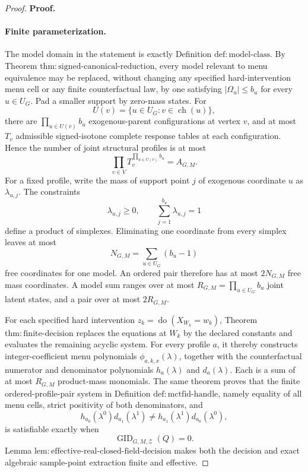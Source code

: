\documentclass{article}
\begin{document}
\begin{proof}
\textbf{Proof.}
\paragraph{Finite parameterization.}
The model domain in the statement is exactly Definition \(\mathrm{def:model\text{-}class}\).  By Theorem \(\mathrm{thm:signed\text{-}canonical\text{-}reduction}\), every model relevant to menu equivalence may be replaced, without changing any specified hard-intervention menu cell or any finite counterfactual law, by one satisfying \(|\Omega_u|\le b_u\) for every \(u\in U_G\).  Pad a smaller support by zero-mass states.  For
\[
 U(v)=\{u\in U_G:v\in\operatorname{ch}(u)\},
\]
there are \(\prod_{u\in U(v)}b_u\) exogenous-parent configurations at vertex \(v\), and at most \(T_v\) admissible signed-isotone complete response tables at each configuration.  Hence the number of joint structural profiles is at most
\[
 \prod_{v\in V}T_v^{\prod_{u\in U(v)}b_u}=A_{G,M}.
\tag{1}
\]
For a fixed profile, write the mass of support point \(j\) of exogenous coordinate \(u\) as \(\lambda_{u,j}\).  The constraints
\[
 \lambda_{u,j}\ge0,
 \qquad
 \sum_{j=1}^{b_u}\lambda_{u,j}=1
\tag{2}
\]
define a product of simplexes.  Eliminating one coordinate from every simplex leaves at most
\[
 N_{G,M}=\sum_{u\in U_G}(b_u-1)
\tag{3}
\]
free coordinates for one model.  An ordered pair therefore has at most \(2N_{G,M}\) free mass coordinates.  A model sum ranges over at most \(R_{G,M}=\prod_{u\in U_G}b_u\) joint latent states, and a pair over at most \(2R_{G,M}\).

For each specified hard intervention \(z_k=\operatorname{do}(X_{W_k}=w_k)\), Theorem \(\mathrm{thm:finite\text{-}decision}\) replaces the equations at \(W_k\) by the declared constants and evaluates the remaining acyclic system.  For every profile \(a\), it thereby constructs integer-coefficient menu polynomials \(\phi_{a,k,x}(\lambda)\), together with the counterfactual numerator and denominator polynomials \(h_a(\lambda)\) and \(d_a(\lambda)\).  Each is a sum of at most \(R_{G,M}\) product-mass monomials.  The same theorem proves that the finite ordered-profile-pair system in Definition \(\mathrm{def:mctfid\text{-}handle}\), namely equality of all menu cells, strict positivity of both denominators, and
\[
 h_{a_0}(\lambda^0)d_{a_1}(\lambda^1)
 \ne
 h_{a_1}(\lambda^1)d_{a_0}(\lambda^0),
\tag{4}
\]
is satisfiable exactly when
\[
 \operatorname{GID}_{G,M,\mathcal Z}(Q)=0.
\tag{5}
\]
Lemma \(\mathrm{lem:effective\text{-}real\text{-}closed\text{-}field\text{-}decision}\) makes both the decision and exact algebraic sample-point extraction finite and effective.


\end{proof}
\end{document}
